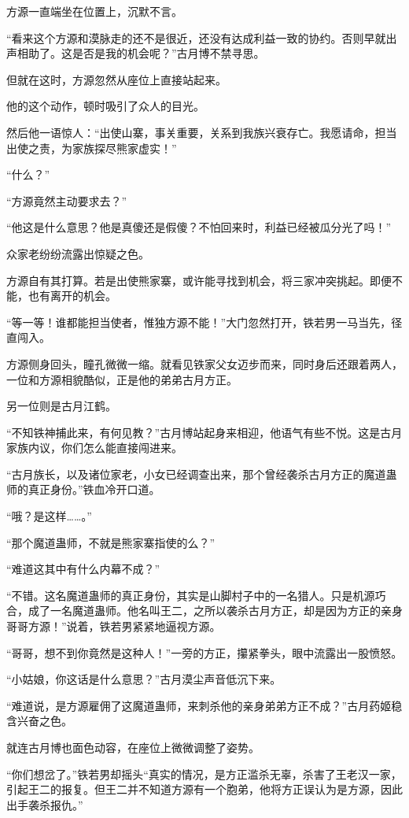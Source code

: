 \begin{this_body}
方源一直端坐在位置上，沉默不言。

“看来这个方源和漠脉走的还不是很近，还没有达成利益一致的协约。否则早就出声相助了。这是否是我的机会呢？”古月博不禁寻思。

但就在这时，方源忽然从座位上直接站起来。

他的这个动作，顿时吸引了众人的目光。

然后他一语惊人：“出使山寨，事关重要，关系到我族兴衰存亡。我愿请命，担当出使之责，为家族探尽熊家虚实！”

“什么？”

“方源竟然主动要求去？”

“他这是什么意思？他是真傻还是假傻？不怕回来时，利益已经被瓜分光了吗！”

众家老纷纷流露出惊疑之色。

方源自有其打算。若是出使熊家寨，或许能寻找到机会，将三家冲突挑起。即便不能，也有离开的机会。

“等一等！谁都能担当使者，惟独方源不能！”大门忽然打开，铁若男一马当先，径直闯入。

方源侧身回头，瞳孔微微一缩。就看见铁家父女迈步而来，同时身后还跟着两人，一位和方源相貌酷似，正是他的弟弟古月方正。

另一位则是古月江鹤。

“不知铁神捕此来，有何见教？”古月博站起身来相迎，他语气有些不悦。这是古月家族内议，你们怎么能直接闯进来。

“古月族长，以及诸位家老，小女已经调查出来，那个曾经袭杀古月方正的魔道蛊师的真正身份。”铁血冷开口道。

“哦？是这样……。”

“那个魔道蛊师，不就是熊家寨指使的么？”

“难道这其中有什么内幕不成？”

“不错。这名魔道蛊师的真正身份，其实是山脚村子中的一名猎人。只是机源巧合，成了一名魔道蛊师。他名叫王二，之所以袭杀古月方正，却是因为方正的亲身哥哥方源！”说着，铁若男紧紧地逼视方源。

“哥哥，想不到你竟然是这种人！”一旁的方正，攥紧拳头，眼中流露出一股愤怒。

“小姑娘，你这话是什么意思？”古月漠尘声音低沉下来。

“难道说，是方源雇佣了这魔道蛊师，来刺杀他的亲身弟弟方正不成？”古月药姬稳含兴奋之色。

就连古月博也面色动容，在座位上微微调整了姿势。

“你们想岔了。”铁若男却摇头“真实的情况，是方正滥杀无辜，杀害了王老汉一家，引起王二的报复。但王二并不知道方源有一个胞弟，他将方正误认为是方源，因此出手袭杀报仇。”


\end{this_body}
